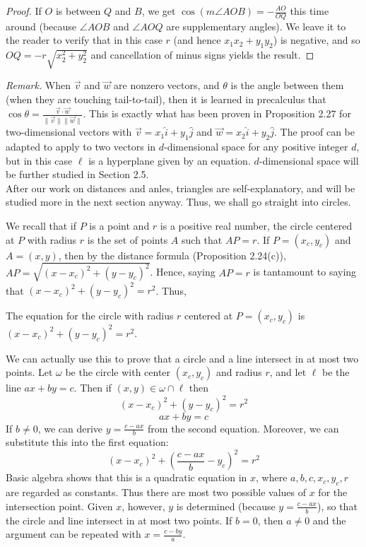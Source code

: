 \documentclass[leqno]{book}
\begin{document}
\begin{proof}
If $O$ is between $Q$ and $B$, we get $\cos(m\angle AOB)=-\frac{AO}{OQ}$ this time around (because $\angle AOB$ and $\angle AOQ$ are supplementary angles).  We leave it to the reader to verify that in this case $r$ (and hence $x_1x_2+y_1y_2$) is negative, and so $OQ=-r\sqrt{x_2^2+y_2^2}$ and cancellation of minus signs yields the result.
\end{proof}

\noindent\emph{Remark.} When $\vec v$ and $\vec w$ are nonzero vectors, and $\theta$ is the angle between them (when they are touching tail-to-tail), then it is learned in precalculus that $\cos\theta=\frac{\vec v\cdot\vec w}{\|\vec v\|\|\vec w\|}$.  This is exactly what has been proven in Proposition 2.27 for two-dimensional vectors with $\vec v=x_1\hat i+y_1\hat j$ and $\vec w=x_2\hat i+y_2\hat j$.  The proof can be adapted to apply to two vectors in $d$-dimensional space for any positive integer $d$, but in this case $\ell$ is a hyperplane given by an equation.  $d$-dimensional space will be further studied in Section 2.5.\\

\noindent After our work on distances and anles, triangles are self-explanatory, and will be studied more in the next section anyway.  Thus, we shall go straight into circles.

We recall that if $P$ is a point and $r$ is a positive real number, the circle centered at $P$ with radius $r$ is the set of points $A$ such that $AP=r$.  If $P=(x_c,y_c)$ and $A=(x,y)$, then by the distance formula (Proposition 2.24(c)), $AP=\sqrt{(x-x_c)^2+(y-y_c)^2}$.  Hence, saying $AP=r$ is tantamount to saying that $(x-x_c)^2+(y-y_c)^2=r^2$.  Thus,
\begin{center}
The equation for the circle with radius $r$ centered at $P=(x_c,y_c)$ is $(x-x_c)^2+(y-y_c)^2=r^2$.
\end{center}
We can actually use this to prove that a circle and a line intersect in at most two points.  Let $\omega$ be the circle with center $(x_c,y_c)$ and radius $r$, and let $\ell$ be the line $ax+by=c$.  Then if $(x,y)\in\omega\cap\ell$ then
$$(x-x_c)^2+(y-y_c)^2=r^2$$
$$ax+by=c$$
If $b\ne 0$, we can derive $y=\frac{c-ax}b$ from the second equation.  Moreover, we can substitute this into the first equation:
$$(x-x_c)^2+\left(\frac{c-ax}b-y_c\right)^2=r^2$$
Basic algebra shows that this is a quadratic equation in $x$, where $a,b,c,x_c,y_c,r$ are regarded as constants.  Thus there are most two possible values of $x$ for the intersection point.  Given $x$, however, $y$ is determined (because $y=\frac{c-ax}b$), so that the circle and line intersect in at most two points.  If $b=0$, then $a\ne 0$ and the argument can be repeated with $x=\frac{c-by}a$.
\end{document}
